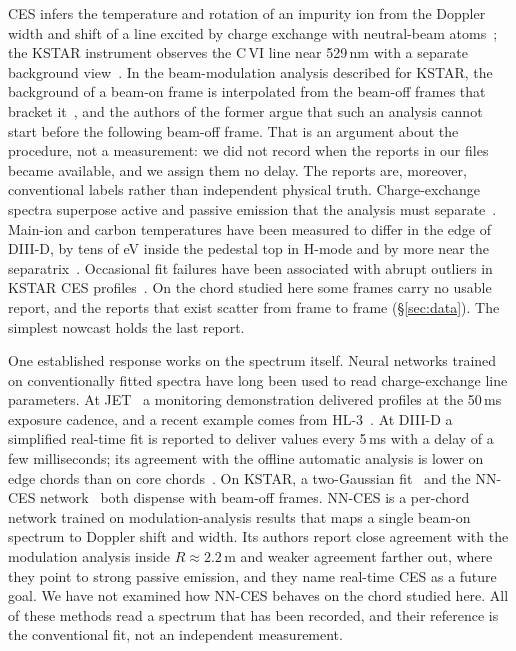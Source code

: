 CES infers the temperature and rotation of an impurity ion from the Doppler width and shift of a line excited by charge exchange with neutral-beam atoms~\citep{Fonck1984DeterminationPlasma}; the KSTAR instrument observes the C\,VI line near 529\,nm with a separate background view~\citep{Ko2010ChargeExchange}. In the beam-modulation analysis described for KSTAR, the background of a beam-on frame is interpolated from the beam-off frames that bracket it~\citep{Lee2020TwoGaussian,Lee2026NeuralNetworkbased}, and the authors of the former argue that such an analysis cannot start before the following beam-off frame. That is an argument about the procedure, not a measurement: we did not record when the reports in our files became available, and we assign them no delay. The reports are, moreover, conventional labels rather than independent physical truth. Charge-exchange spectra superpose active and passive emission that the analysis must separate~\citep{Viezzer2011PassiveEdge}. Main-ion and carbon temperatures have been measured to differ in the edge of DIII-D, by tens of eV inside the pedestal top in H-mode and by more near the separatrix~\citep{Haskey2018MainIon}. Occasional fit failures have been associated with abrupt outliers in KSTAR CES profiles~\citep{Kim2024KineticProfile}. On the chord studied here some frames carry no usable report, and the reports that exist scatter from frame to frame (\S\ref{sec:data}). The simplest nowcast holds the last report.

One established response works on the spectrum itself. Neural networks trained on conventionally fitted spectra have long been used to read charge-exchange line parameters. At JET~\citep{Bishop1993AutomaticAnalysis,Svensson1999AnalysisJet} a monitoring demonstration delivered \Ti{} profiles at the 50\,ms exposure cadence, and a recent example comes from HL-3~\citep{Tian2026RealTimeCxrs}. At DIII-D a simplified real-time fit is reported to deliver values every 5\,ms with a delay of a few milliseconds; its agreement with the offline automatic analysis is lower on edge chords than on core chords~\citep{Chrystal2026RealTime}. On KSTAR, a two-Gaussian fit~\citep{Lee2020TwoGaussian} and the NN-CES network~\citep{Lee2026NeuralNetworkbased} both dispense with beam-off frames. NN-CES is a per-chord network trained on modulation-analysis results that maps a single beam-on spectrum to Doppler shift and width. Its authors report close agreement with the modulation analysis inside $R\approx2.2$\,m and weaker agreement farther out, where they point to strong passive emission, and they name real-time CES as a future goal. We have not examined how NN-CES behaves on the chord studied here. All of these methods read a spectrum that has been recorded, and their reference is the conventional fit, not an independent measurement.

